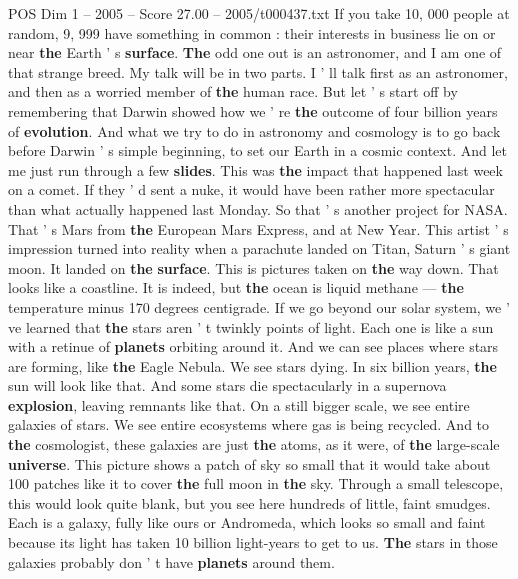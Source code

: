 \begin{textsample}{POS Dim 1 – 2005 – Score 27.00 – 2005/t000437.txt}  \label{ex:f1_pos_007}
If you take 10, 000 people at random, 9, 999 have something in common : their interests in business lie on or near \textbf{the} Earth ' s \textbf{surface}. \textbf{The} odd one out is an astronomer, and I am one of that strange breed.
My talk will be in two parts.
I ' ll talk first as an astronomer, and then as a worried member of \textbf{the} human race.
But let ' s start off by remembering that Darwin showed how we ' re \textbf{the} outcome of four billion years of \textbf{evolution}.
And what we try to do in astronomy and cosmology is to go back before Darwin ' s simple beginning, to set our Earth in a cosmic context.
And let me just run through a few \textbf{slides}.
This was \textbf{the} impact that happened last week on a comet.
If they ' d sent a nuke, it would have been rather more spectacular than what actually happened last Monday.
So that ' s another project for NASA.
That ' s Mars from \textbf{the} European Mars Express, and at New Year.
This artist ' s impression turned into reality when a parachute landed on Titan, Saturn ' s giant moon.
It landed on \textbf{the} \textbf{surface}.
This is pictures taken on \textbf{the} way down.
That looks like a coastline.
It is indeed, but \textbf{the} ocean is liquid methane — \textbf{the} temperature minus 170 degrees centigrade.
If we go beyond our solar system, we ' ve learned that \textbf{the} stars aren ' t twinkly points of light.
Each one is like a sun with a retinue of \textbf{planets} orbiting around it.
And we can see places where stars are forming, like \textbf{the} Eagle Nebula.
We see stars dying.
In six billion years, \textbf{the} sun will look like that.
And some stars die spectacularly in a supernova \textbf{explosion}, leaving remnants like that.
On a still bigger scale, we see entire galaxies of stars.
We see entire ecosystems where gas is being recycled.
And to \textbf{the} cosmologist, these galaxies are just \textbf{the} atoms, as it were, of \textbf{the} large-scale \textbf{universe}.
This picture shows a patch of sky so small that it would take about 100 patches like it to cover \textbf{the} full moon in \textbf{the} sky.
Through a small telescope, this would look quite blank, but you see here hundreds of little, faint smudges.
Each is a galaxy, fully like ours or Andromeda, which looks so small and faint because its light has taken 10 billion light-years to get to us. \textbf{The} stars in those galaxies probably don ' t have \textbf{planets} around them.

\end{textsample}
